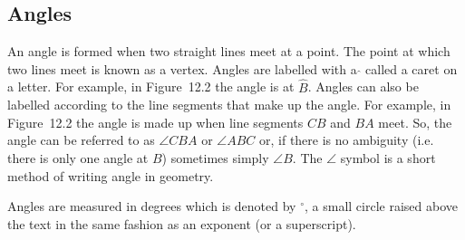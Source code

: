 \subsection{ Angles}
\nopagebreak
An angle is formed when two straight lines meet at a point. The point at which two lines meet is known as a vertex. Angles are labelled with a $\hat{}$ called a caret on a letter. For example, in Figure~12.2 the angle is at $\hat{B}$. Angles can also be labelled according to the line segments that make up the angle. For example, in Figure~12.2 the angle is made up when line segments $CB$ and $BA$ meet. So, the angle can be referred to as $\angle CBA$ or $\angle ABC$ or, if there is no ambiguity (i.e. there is only one angle at $B$) sometimes simply $\angle B$. The $\angle $ symbol is a short method of writing angle in geometry.\par 
Angles are measured in degrees which is denoted by $^{\circ }$, a small circle raised above the text in the same fashion as an exponent (or a superscript).\par 



